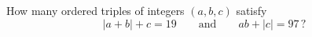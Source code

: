 How many ordered triples of integers $(a,b,c)$ satisfy
\[|a+b|+c=19\qquad\text{and}\qquad ab+|c|=97\,?\]
